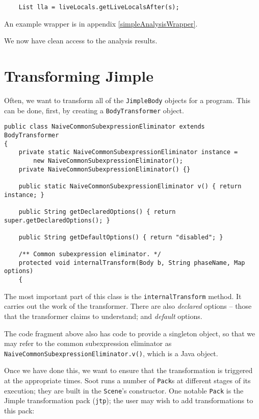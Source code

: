 \documentclass{article}
\begin{document}
\begin{verbatim}
    List lla = liveLocals.getLiveLocalsAfter(s);
\end{verbatim}

An example wrapper is in appendix \ref{simpleAnalysisWrapper}.

We now have clean access to the analysis results.

\section{Transforming Jimple}

Often, we want to transform all of the {\tt JimpleBody} objects for a
program.  This can be done, first, by creating a {\tt BodyTransformer}
object.

\begin{verbatim}
public class NaiveCommonSubexpressionEliminator extends BodyTransformer
{ 
    private static NaiveCommonSubexpressionEliminator instance = 
        new NaiveCommonSubexpressionEliminator();
    private NaiveCommonSubexpressionEliminator() {}

    public static NaiveCommonSubexpressionEliminator v() { return instance; }

    public String getDeclaredOptions() { return super.getDeclaredOptions(); }

    public String getDefaultOptions() { return "disabled"; }

    /** Common subexpression eliminator. */
    protected void internalTransform(Body b, String phaseName, Map options)
    {
\end{verbatim}

The most important part of this class is the {\tt internalTransform}
method.  It carries out the work of the transformer.  There are also
{\em declared} options -- those that the transformer claims to understand;
and {\em default} options.

The code fragment above also has code to provide a singleton object,
so that we may refer to the common subexpression eliminator as
{\tt NaiveCommonSubexpressionEliminator.v()}, which is a Java object.

Once we have done this, we want to ensure that the transformation
is triggered at the appropriate times.  Soot runs a number of {\tt Pack}s 
at different stages of its execution; they are built in the {\tt Scene}'s
constructor.  One notable {\tt Pack} is the Jimple transformation pack
({\tt jtp}); the user may wish to add transformations to this pack:
\end{document}

